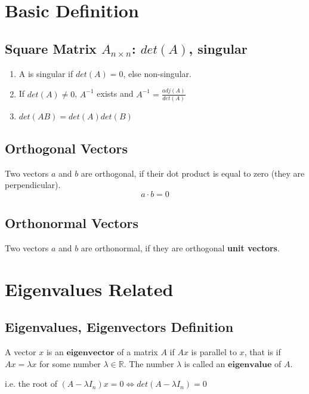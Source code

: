 \documentclass[11pt]{elegantbook}
\begin{document}
\chapter{Basic Definition}
\section{Square Matrix $A_{n\times n}$: $det(A)$, singular}
\begin{enumerate}
    \item A is singular if $det(A)=0$, else non-singular.
    \item If $det(A)\neq 0$, $A^{-1}$ exists and $A^{-1}=\frac{adj(A)}{det(A)}$
    \item $det(AB)=det(A)det(B)$
\end{enumerate}

\section{Orthogonal Vectors}
Two vectors $a$ and $b$ are orthogonal, if their dot product is equal to zero (they are perpendicular). $$a\cdot b=0$$

\section{Orthonormal Vectors}
Two vectors $a$ and $b$ are orthonormal, if they are orthogonal \textbf{unit vectors}.





\chapter{Eigenvalues Related}
\section{Eigenvalues, Eigenvectors Definition}
A vector $x$ is an $\textbf{eigenvector}$ of a matrix $A$ if $Ax$ is parallel to $x$, that is if $Ax = \lambda x$ for some number $\lambda\in \mathbb{R}$. The number $\lambda$ is called an $\textbf{eigenvalue}$ of $A$.

i.e. the root of $(A-\lambda I_n)x=0 \Leftrightarrow det(A-\lambda I_n)=0$
\end{document}

